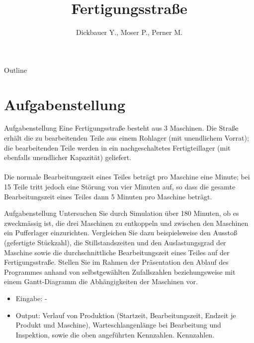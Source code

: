

\title[BSP23 - Fertigungsstraße]{Fertigungsstraße}
\author{Dickbauer Y., Moser P., Perner M.}



\begin{frame}
  \titlepage
\end{frame}

\begin{frame}{Outline}
  \tableofcontents
\end{frame}

\section{Aufgabenstellung}
\begin{frame}{Aufgabenstellung}
Eine Fertigungsstraße besteht aus 3 Maschinen. Die Straße erhält die zu bearbeitenden
Teile aus einem Rohlager (mit unendlichem Vorrat); die bearbeitenden Teile werden in
ein nachgeschaltetes Fertigteillager (mit ebenfalls unendlicher Kapazität) geliefert.\\~\\
Die normale Bearbeitungszeit eines Teiles beträgt pro Maschine eine Minute; bei 15%
Teile tritt jedoch eine Störung von vier Minuten auf, so dass die gesamte Bearbeitungszeit
eines Teiles dann 5 Minuten pro Maschine beträgt.
\end{frame}

\begin{frame}{Aufgabenstellung}
Untersuchen Sie durch Simulation über 180 Minuten, ob es zweckmässig ist, die drei
Maschinen zu entkoppeln und zwischen den Maschinen ein Pufferlager einzurichten. Vergleichen
Sie dazu beispielsweise den Ausstoß (gefertigte Stückzahl), die Stillstandszeiten
und den Auslastungsgrad der Maschine sowie die durchschnittliche Bearbeitungszeit eines
Teiles auf der Fertigungsstraße. Stellen Sie im Rahmen der Präsentation den Ablauf
des Programmes anhand von selbstgewählten Zufallszahlen beziehungsweise mit einem
Gantt-Diagramm die Abhängigkeiten der Maschinen vor.
\begin{itemize}
  \item Eingabe: -
  \item Output: Verlauf von Produktion (Startzeit, Bearbeitungszeit, Endzeit je Produkt
und Maschine), Warteschlangenlänge bei Bearbeitung und Inspektion, sowie die
oben angeführten Kennzahlen.
Kennzahlen.
\end{itemize}
\end{frame}

